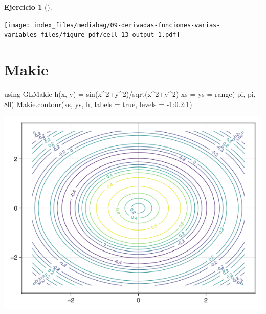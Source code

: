 \documentclass[
  a4paper,
]{scrreport}
\newenvironment{Shaded}{\begin{snugshade}}{\end{snugshade}}
\newcommand{\BuiltInTok}[1]{\textcolor[rgb]{0.00,0.23,0.31}{#1}}
\newcommand{\ConstantTok}[1]{\textcolor[rgb]{0.56,0.35,0.01}{#1}}
\newcommand{\FloatTok}[1]{\textcolor[rgb]{0.68,0.00,0.00}{#1}}
\newcommand{\FunctionTok}[1]{\textcolor[rgb]{0.28,0.35,0.67}{#1}}
\newcommand{\ImportTok}[1]{\textcolor[rgb]{0.00,0.46,0.62}{#1}}
\newcommand{\NormalTok}[1]{\textcolor[rgb]{0.00,0.23,0.31}{#1}}
\newcommand{\OperatorTok}[1]{\textcolor[rgb]{0.37,0.37,0.37}{#1}}
\theoremstyle{definition}
\newtheorem{exercise}{Ejercicio}[chapter]
\theoremstyle{remark}
\begin{document}
\begin{exercise}[]
\begin{enumerate}
\begin{tcolorbox}
  \texttt{[image: index\_files/mediabag/09-derivadas-funciones-varias-variables\_files/figure-pdf/cell-13-output-1.pdf]}

  \section{Makie}

\begin{Shaded}
\begin{Highlighting}[]
\ImportTok{using} \BuiltInTok{GLMakie}
\FunctionTok{h}\NormalTok{(x, y) }\OperatorTok{=} \FunctionTok{sin}\NormalTok{(x}\OperatorTok{\^{}}\FloatTok{2}\OperatorTok{+}\NormalTok{y}\OperatorTok{\^{}}\FloatTok{2}\NormalTok{)}\OperatorTok{/}\FunctionTok{sqrt}\NormalTok{(x}\OperatorTok{\^{}}\FloatTok{2}\OperatorTok{+}\NormalTok{y}\OperatorTok{\^{}}\FloatTok{2}\NormalTok{)}
\NormalTok{xs }\OperatorTok{=}\NormalTok{ ys }\OperatorTok{=} \FunctionTok{range}\NormalTok{(}\OperatorTok{{-}}\ConstantTok{pi}\NormalTok{, }\ConstantTok{pi}\NormalTok{, }\FloatTok{80}\NormalTok{)}
\NormalTok{Makie.}\FunctionTok{contour}\NormalTok{(xs, ys, h, labels }\OperatorTok{=} \ConstantTok{true}\NormalTok{,  levels }\OperatorTok{=} \OperatorTok{{-}}\FloatTok{1}\OperatorTok{:}\FloatTok{0.2}\OperatorTok{:}\FloatTok{1}\NormalTok{)}
\end{Highlighting}
\end{Shaded}

  \includegraphics{09-derivadas-funciones-varias-variables_files/figure-pdf/cell-14-output-1.png}

  \end{tcolorbox}
\end{enumerate}

\end{exercise}
\end{document}
